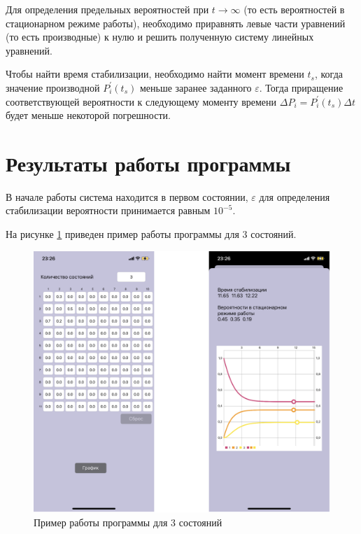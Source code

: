 \documentclass[14pt, a4paper]{extarticle}
\begin{document}
Для определения предельных вероятностей при $t \to \infty$ (то есть вероятностей в стационарном режиме работы), необходимо приравнять левые части уравнений (то есть производные) к нулю и решить полученную систему линейных уравнений. 

Чтобы найти время стабилизации, необходимо найти момент времени $t_s$, когда значение производной $P_{i}^{'}(t_s)$ меньше заранее заданного $\varepsilon$. Тогда приращение соответствующей вероятности к следующему моменту времени $\Delta P_{i} = P_{i}^{'}(t_s)\Delta t$ будет меньше некоторой погрешности.





\section{Результаты работы программы}

В начале работы система находится в первом состоянии, $\varepsilon$ для определения стабилизации вероятности принимается равным $10^{-5}$.



\newpage
На рисунке \ref{pic:3} приведен пример работы программы для 3 состояний.

\begin{figure}[h]
	\begin{center}
		{\includegraphics[scale=0.15]{pictures/3.png}
			\caption{Пример работы программы для 3 состояний}
			\label{pic:3}}
	\end{center}
\end{figure}
\end{document}
